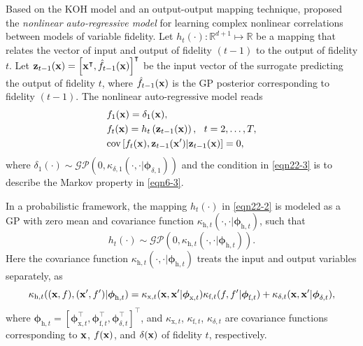 \documentclass[journal ]{new-aiaa}
\begin{document}
Based on the KOH model and an output-output mapping technique, \citet{Perdikaris2017} proposed the \textit{nonlinear auto-regressive model} for learning complex nonlinear correlations between models of variable fidelity.
Let $h_{t}(\cdot):\mathbb{R}^{d+1} \mapsto \mathbb{R}$ be a mapping that relates the vector of input and output of fidelity $(t-1)$ to the output of fidelity $t$.
Let ${\bf z}_{t-1}({\bf x})=\left[{\bf x}^\intercal,\hat{f}_{t-1}({\bf x})\right]^\intercal$ be the input vector of the surrogate predicting the output of fidelity $t$, where $\hat{f}_{t-1}({\bf x})$ is the GP posterior corresponding to fidelity $(t-1)$.
The nonlinear auto-regressive model reads~\citep{Perdikaris2017}
\begin{subequations}\label{eqn22}
	\begin{align}
		&f_1({\bf x})=\delta_1({\bf x}) \label{eqn22-1},\\
		&f_{t}({\bf x})=h_{t}\left({{\bf z}_{t-1}({\bf x})}\right), \ \  t=2,\dots,T \label{eqn22-2},\\
		&\text{cov}\left[f_{t}({\bf x}),{\bf z}_{t-1}({\bf x}')|{\bf z}_{t-1}({\bf x})\right]=0 
		\label{eqn22-3},
	\end{align}
\end{subequations}
where $\delta_1(\cdot) \sim \mathcal{GP}\left(0, \kappa_{\delta,1}(\cdot,\cdot|{\boldsymbol \phi}_{\delta,1})\right)$ and the condition in \cref{eqn22-3} is to describe the Markov property in \cref{eqn6-3}.

In a probabilistic framework, the mapping $h_{t}(\cdot)$ in \cref{eqn22-2} is modeled as a GP with zero mean and covariance function $\kappa_{\text{h},t}(\cdot,\cdot|{\boldsymbol \phi}_{\text{h},t})$, such that
\begin{equation}\label{eqn23}
	h_{t}(\cdot) \sim \mathcal{GP}\left(0, \kappa_{\text{h},t}(\cdot,\cdot|{\boldsymbol \phi}_{\text{h},t})\right).
\end{equation} 
Here the covariance function $\kappa_{\text{h},t}(\cdot,\cdot|{\boldsymbol \phi}_{\text{h},t})$ treats the input and output variables separately, as
\begin{equation}\label{eqn24}
		\kappa_{\text{h},t}(({\bf x},f),({\bf x'},f')|{\boldsymbol \phi}_{\text{h},t})  
		 =\kappa_{\text{x},t}({\bf x},{\bf x}'|{\boldsymbol \phi}_{\text{x},t})\kappa_{\text{f},t}(f,f'|{\boldsymbol \phi}_{\text{f},t}) + \kappa_{\delta,t}({\bf x},{\bf x}'|{\boldsymbol \phi}_{\delta,t}),
\end{equation}
where ${\boldsymbol \phi}_{\text{h},t}=[{\boldsymbol \phi}_{\text{x},t}^\intercal,{\boldsymbol \phi}_{\text{f},t}^\intercal,{\boldsymbol \phi}_{\delta,t}^\intercal]^\intercal$, and $\kappa_{\text{x},t}$, $\kappa_{\text{f},t}$, $\kappa_{\delta,t}$ are covariance functions corresponding to ${\bf x}$, $f({\bf x})$, and $\delta({\bf x})$ of fidelity $t$, respectively.
\end{document}
